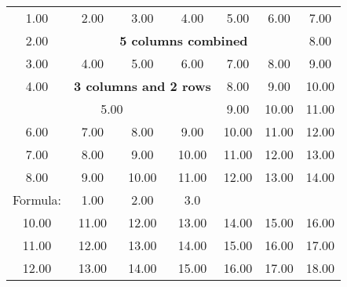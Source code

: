 \begin{tabular}{c|c|c|c|c|c|c|}
1.00 & 2.00 & 3.00 & 4.00 & 5.00 & 6.00 & 7.00\\
2.00 & \multicolumn{5}{c}{\textbf{5 columns combined}} & 8.00\\
3.00 & 4.00 & 5.00 & 6.00 & 7.00 & 8.00 & 9.00\\
4.00 & \multicolumn{3}{c}{\textbf{3 columns and 2 rows}} & 8.00 & 9.00 & 10.00\\
\multicolumn{4}{c}{5.00} & 9.00 & 10.00 & 11.00\\
6.00 & 7.00 & 8.00 & 9.00 & 10.00 & 11.00 & 12.00\\
7.00 & 8.00 & 9.00 & 10.00 & 11.00 & 12.00 & 13.00\\
8.00 & 9.00 & 10.00 & 11.00 & 12.00 & 13.00 & 14.00\\
Formula: & 1.00 & 2.00 & 3.0\\
10.00 & 11.00 & 12.00 & 13.00 & 14.00 & 15.00 & 16.00\\
11.00 & 12.00 & 13.00 & 14.00 & 15.00 & 16.00 & 17.00\\
12.00 & 13.00 & 14.00 & 15.00 & 16.00 & 17.00 & 18.00
\end{tabular}